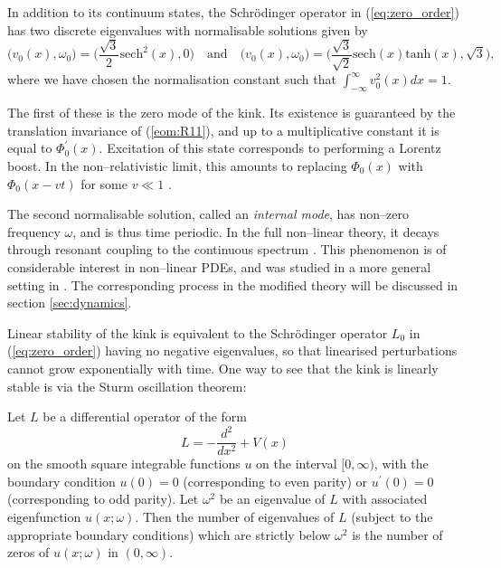 
In addition to its continuum states, the Schr\"odinger operator in (\ref{eq:zero_order}) has two discrete eigenvalues with normalisable solutions given by
\begin{equation}
\label{eq:flat_vib_modes}
\big(v_0(x),\omega_0\big) = \bigg(\frac{\sqrt{3}}{2}\mathrm{sech}^2(x),0\bigg) \quad \mathrm{and} \quad
\big(v_0(x),\omega_0\big) = \bigg(\frac{\sqrt{3}}{\sqrt{2}}\mathrm{sech}(x)\mathrm{tanh}(x),\sqrt{3}\bigg),
\end{equation}
where we have chosen the normalisation constant such that $\int_{-\infty}^{\infty}v_0^2(x)dx=1$.

The first of these is the zero mode of the kink. Its existence is guaranteed by the translation invariance of (\ref{eom:R11}), and up to a multiplicative constant it is equal to $\Phi_0^\prime(x)$. Excitation of this state corresponds to performing a Lorentz boost. In the non--relativistic limit, this amounts to replacing $\Phi_0(x)$ with $\Phi_0(x-vt)$ for some $v\ll 1$ \cite{Manton&Sutcliffe}.

The second normalisable solution, called an \textit{internal mode}, has non--zero frequency $\omega$, and is thus time periodic. In the full non--linear theory, it decays through resonant coupling to the continuous spectrum \cite{Manton&Merabet}. This phenomenon is of considerable interest in non--linear PDEs, and was studied in a more general setting in \cite{SW98}. The corresponding process in the modified theory will be discussed in section \ref{sec:dynamics}.

Linear stability of the kink is equivalent to the Schr\"odinger operator $L_0$ in (\ref{eq:zero_order}) having no negative eigenvalues, so that linearised perturbations cannot grow exponentially with time. One way to see that the kink is linearly stable is via the Sturm oscillation theorem:

\begin{theo}[Sturm]\label{th:sturm} Let $L$ be a differential operator of the form
\[
L=-\frac{d^2}{dx^2}+V(x)
\]
on the smooth square integrable functions $u$ on the interval $[0,\infty)$, with the boundary condition $u(0)=0$ (corresponding to even parity) or $u^\prime(0)=0$ (corresponding to odd parity). Let $\omega^2$ be an eigenvalue of $L$ with associated eigenfunction $u(x;\omega)$. Then the number of eigenvalues of $L$ (subject to the appropriate boundary conditions) which are strictly below $\omega^2$ is the number of zeros of $u(x;\omega)$ in $(0,\infty)$.
\end{theo}

